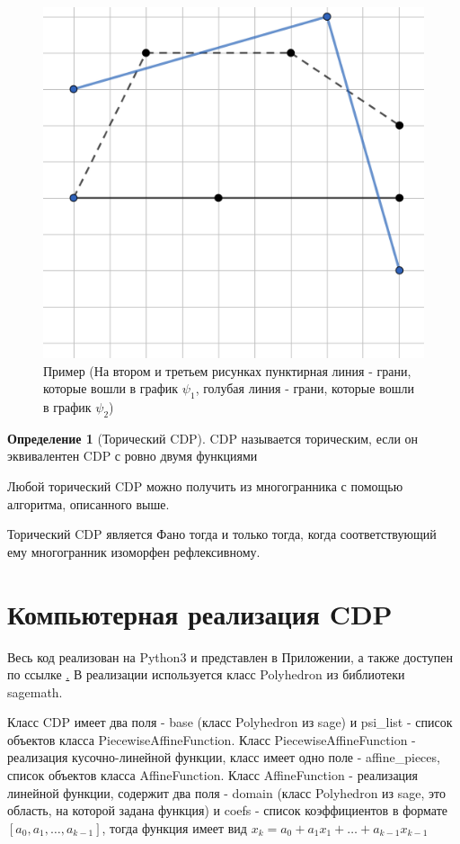\documentclass[fontsize=14pt]{scrartcl}
\theoremstyle{definition}
\newtheorem{definition}{Определение}[section]
\begin{document}
\begin{figure}[!htb]
%
  \includegraphics[width=\linewidth]{poly3.png}
  \caption{CDP}\label{fig:awesome_image3}
\endminipage
\caption{Пример (На втором и третьем рисунках пунктирная линия - грани, которые вошли в график  $\psi_1$, голубая линия - грани, которые вошли в график $\psi_2$)}
\end{figure}

\begin{definition}[Торический CDP]
CDP называется торическим, если он эквивалентен CDP с ровно двумя функциями
\end{definition}

Любой торический CDP можно получить из многогранника с помощью алгоритма, описанного выше.

Торический CDP является Фано тогда и только тогда, когда соответствующий ему многогранник изоморфен рефлексивному.
\section{Компьютерная реализация CDP}
Весь код реализован на Python3 и представлен в Приложении, а также доступен по ссылке \href{https://github.com/irina-batmanova/masters}. В реализации используется класс Polyhedron из библиотеки sagemath.

Класс CDP имеет два поля - base (класс Polyhedron из sage) и psi\_list - список объектов класса PiecewiseAffineFunction. 
Класс PiecewiseAffineFunction - реализация кусочно-линейной функции, класс имеет одно поле - affine\_pieces, список объектов класса AffineFunction. Класс AffineFunction - реализация линейной функции, содержит два поля - domain (класс Polyhedron из sage, это область, на которой задана функция) и coefs - список коэффициентов в формате $[a_0, a_1, \dots, a_{k-1}]$, тогда функция имеет вид $x_k = a_0 + a_1 x_1 + \dots + a_{k-1} x_{k-1}$
\end{document}
